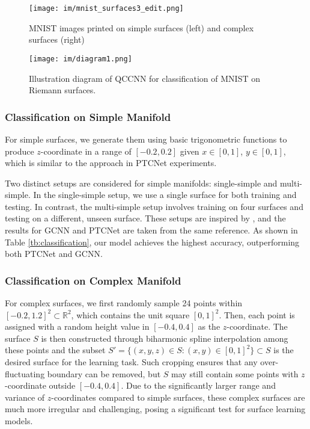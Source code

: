 \begin{figure}
    \centering
    \texttt{[image: im/mnist\_surfaces3\_edit.png]}
    \caption{MNIST images printed on simple surfaces (left) and complex surfaces (right)}
    \label{fig:mnist_surfaces}
\end{figure}

\begin{figure}
    \centering
    \texttt{[image: im/diagram1.png]}
    \caption{Illustration diagram of QCCNN for classification of MNIST on Riemann surfaces.}
    \label{fig:diagram1}
\end{figure}

\subsubsection{Classification on Simple Manifold}
For simple surfaces, we generate them using basic trigonometric functions to produce $z$-coordinate in a range of $[-0.2,0.2]$ given $x \in [0,1]$, $y \in [0,1]$, which is similar to the approach in PTCNet experiments. 

Two distinct setups are considered for simple manifolds: single-simple and multi-simple. In the single-simple setup, we use a single surface for both training and testing. In contrast, the multi-simple setup involves training on four surfaces and testing on a different, unseen surface. These setups are inspired by \cite{schonsheck2022parallel}, and the results for GCNN and PTCNet are taken from the same reference. As shown in Table \ref{tb:classification}, our model achieves the highest accuracy, outperforming both PTCNet and GCNN.

\subsubsection{Classification on Complex Manifold}
For complex surfaces, we first randomly sample 24 points within $[-0.2, 1.2]^2 \subset \mathbb{R}^2$, which contains the unit square $[0,1]^2$. Then, each point is assigned with a random height value in $[-0.4,0.4]$ as the $z$-coordinate. The surface $S$ is then constructed through biharmonic spline interpolation among these points and the subset $S'=\{(x,y,z) \in S : (x,y) \in [0,1]^2\} \subset S$ is the desired surface for the learning task. Such cropping ensures that any over-fluctuating boundary can be removed, but $S$ may still contain some points with $z$-coordinate outside $[-0.4,0.4]$. Due to the significantly larger range and variance of $z$-coordinates compared to simple surfaces, these complex surfaces are much more irregular and challenging, posing a significant test for surface learning models.

